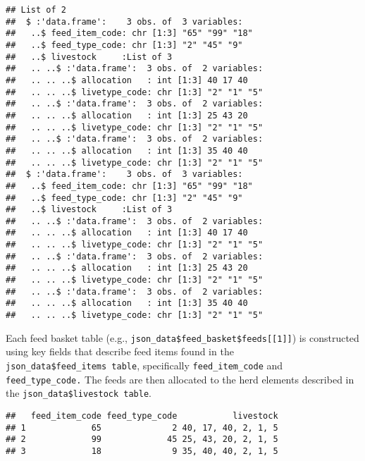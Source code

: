 \documentclass[
]{article}
\newenvironment{Shaded}{\begin{snugshade}}{\end{snugshade}}
\newcommand{\DecValTok}[1]{\textcolor[rgb]{0.00,0.00,0.81}{#1}}
\newcommand{\NormalTok}[1]{#1}
\newcommand{\SpecialCharTok}[1]{\textcolor[rgb]{0.00,0.00,0.00}{#1}}
\begin{document}
\begin{verbatim}
## List of 2
##  $ :'data.frame':    3 obs. of  3 variables:
##   ..$ feed_item_code: chr [1:3] "65" "99" "18"
##   ..$ feed_type_code: chr [1:3] "2" "45" "9"
##   ..$ livestock     :List of 3
##   .. ..$ :'data.frame':  3 obs. of  2 variables:
##   .. .. ..$ allocation   : int [1:3] 40 17 40
##   .. .. ..$ livetype_code: chr [1:3] "2" "1" "5"
##   .. ..$ :'data.frame':  3 obs. of  2 variables:
##   .. .. ..$ allocation   : int [1:3] 25 43 20
##   .. .. ..$ livetype_code: chr [1:3] "2" "1" "5"
##   .. ..$ :'data.frame':  3 obs. of  2 variables:
##   .. .. ..$ allocation   : int [1:3] 35 40 40
##   .. .. ..$ livetype_code: chr [1:3] "2" "1" "5"
##  $ :'data.frame':    3 obs. of  3 variables:
##   ..$ feed_item_code: chr [1:3] "65" "99" "18"
##   ..$ feed_type_code: chr [1:3] "2" "45" "9"
##   ..$ livestock     :List of 3
##   .. ..$ :'data.frame':  3 obs. of  2 variables:
##   .. .. ..$ allocation   : int [1:3] 40 17 40
##   .. .. ..$ livetype_code: chr [1:3] "2" "1" "5"
##   .. ..$ :'data.frame':  3 obs. of  2 variables:
##   .. .. ..$ allocation   : int [1:3] 25 43 20
##   .. .. ..$ livetype_code: chr [1:3] "2" "1" "5"
##   .. ..$ :'data.frame':  3 obs. of  2 variables:
##   .. .. ..$ allocation   : int [1:3] 35 40 40
##   .. .. ..$ livetype_code: chr [1:3] "2" "1" "5"
\end{verbatim}

Each feed basket table (e.g.,
\texttt{json\_data\$feed\_basket\$feeds{[}{[}1{]}{]}}) is constructed
using key fields that describe feed items found in the
\texttt{json\_data\$feed\_items\ table}, specifically
\texttt{feed\_item\_code} and \texttt{feed\_type\_code.} The feeds are
then allocated to the herd elements described in the
\texttt{json\_data\$livestock\ table}.

\begin{Shaded}
\end{Shaded}

\begin{verbatim}
##   feed_item_code feed_type_code           livestock
## 1             65              2 40, 17, 40, 2, 1, 5
## 2             99             45 25, 43, 20, 2, 1, 5
## 3             18              9 35, 40, 40, 2, 1, 5
\end{verbatim}
\end{document}
